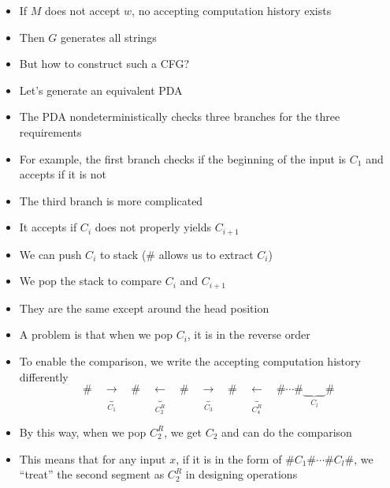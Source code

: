 \begin{frame}[allowframebreaks]
\begin{itemize}
\item If $M$ does not accept $w$, no accepting computation
  history exists
\item [] Then $G$ generates all strings
\item But how to construct such a CFG?
\item Let's generate an equivalent PDA
\item The PDA nondeterministically checks three branches
  for the three requirements
\item For example, the first branch checks if the beginning
  of the input is $C_1$ and
  accepts if it is not
\item The third branch is more complicated
\item It accepts if $C_i$ does not properly yields $C_{i+1}$
\item We can push $C_i$ to stack (\# allows us to extract $C_i$)
\item We pop the stack to compare $C_i$ and $C_{i+1}$
\item They are the same except around the head position
\item A problem is that when we pop $C_i$, it is in
  the reverse order
\item To enable the comparison, we write the accepting
  computation history differently
  \begin{equation*}
    \#\underbrace{\quad \rightarrow \quad}_{C_1}\#\underbrace{\quad \leftarrow \quad}_{C_2^R}\#
    \underbrace{\quad \rightarrow \quad}_{C_3}\#\underbrace{\quad \leftarrow \quad}_{C_4^R}\#
    \cdots\#\underbrace{\qquad}_{C_l}\#
  \end{equation*}
\item By this way, when we pop $C_2^R$, we get $C_2$ and can do the
  comparison
\item This means that for any input $x$, if it is in the form of
  $\#C_1\# \cdots \# C_l\#$, we ``treat'' the second
  segment as $C_2^R$ in designing operations
\end{itemize}
\end{frame}



